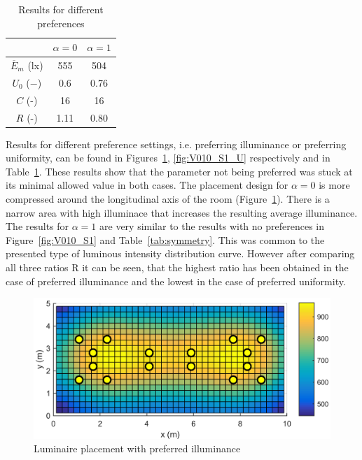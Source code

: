 \begin{table}[b]
	\renewcommand{\arraystretch}{1.3}
	\caption{Results for different preferences}
 	\label{tab:preferences}
	\centering
  \begin{tabular}{| c | c | c |}
    \hline
    & $\alpha = 0$ & $\alpha = 1$ \\
    \hline
    $\overline{E}_{m}$ (lx) & 555 & 504 \\
    \hline
		$U_0$ ($-$)& 0.6 & 0.76 \\
    \hline
		$C$ (-) & 16 & 16 \\
	\hline
		$R$ (-) & 1.11 & 0.80 \\
  \hline
  \end{tabular}
\end{table}

Results for different preference settings, i.e. preferring illuminance or preferring uniformity, can be found in Figures~\ref{fig:V010_S1_E}, \ref{fig:V010_S1_U} respectively and in Table~\ref{tab:preferences}. These results show that the parameter not being preferred was stuck at its minimal allowed value in both cases. The placement design for $\alpha = 0$ is more compressed around the longitudinal axis of the room (Figure~\ref{fig:V010_S1_E}). There is a narrow area with high illuminace that increases the resulting average illuminance. The results for $\alpha = 1$ are very similar to the results with no preferences in Figure~\ref{fig:V010_S1} and Table~\ref{tab:symmetry}. This was common to the presented type of luminous intensity distribution curve. However after comparing all three ratios R it can be seen, that the highest ratio has been obtained in the case of preferred illuminance and the lowest in the case of preferred uniformity.

\begin{figure}[tb]
  \centering
  \includegraphics[width=\columnwidth]{../Vysledky/MSTR_SLB_4x18W_5G4_Fit2_E_V010_S1}
  \caption{Luminaire placement with preferred illuminance}
  \label{fig:V010_S1_E}
\end{figure}

